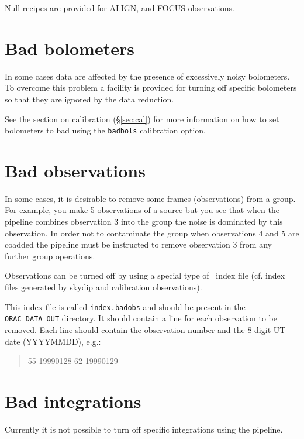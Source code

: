 \documentclass[twoside,11pt,nolof]{starlink}
\providecommand{\oracdr}{\xref{\textsc{orac-dr}}{sun230}{}}
\begin{document}
Null recipes are provided for ALIGN, and FOCUS observations.


\section{Bad bolometers}

In some cases data are affected by the presence of excessively noisy
bolometers. To overcome this problem a facility is provided for turning
off specific bolometers so that they are ignored by the data reduction.

See the section on calibration (\S\ref{sec:cal}) for more information on how
to set bolometers to bad using the \texttt{badbols} calibration option.


\section{Bad observations}

In some cases, it is desirable to remove some frames (observations)
from a group. For example, you make 5 observations of a source
but you see that when the pipeline combines observation 3 into the
group the noise is dominated by this observation. In order
not to contaminate the group when observations 4 and 5 are coadded
the pipeline must be instructed to remove observation 3 from any further
group operations.

Observations can be turned off by using a special type of
\oracdr\ index file (cf. index files generated by skydip and
calibration observations).

This index file is called \texttt{index.badobs} and should be present in the
\texttt{ORAC\_DATA\_OUT} directory. It should contain a line for each observation to be
removed. Each line should contain the observation number and the 8 digit UT
date (YYYYMMDD), e.g.:

\begin{quote}
\begin{terminalv}
55  19990128
62  19990129
\end{terminalv}
\end{quote}



\section{Bad integrations}

Currently it is not possible to turn off specific integrations
using the pipeline.
\end{document}
